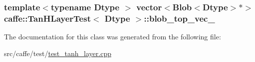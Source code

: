 \hypertarget{classcaffe_1_1_tan_h_layer_test_a44291748cc6643979a3dd592539f26d2}{
\subsubsection[{blob\+\_\+top\+\_\+vec\+\_\+}]{\setlength{\rightskip}{0pt plus 5cm}template$<$typename Dtype $>$ vector$<${\bf Blob}$<$Dtype$>$$\ast$$>$ {\bf caffe\+::\+Tan\+H\+Layer\+Test}$<$ Dtype $>$\+::blob\+\_\+top\+\_\+vec\+\_\+\hspace{0.3cm}{\ttfamily [protected]}}}\label{classcaffe_1_1_tan_h_layer_test_a44291748cc6643979a3dd592539f26d2}


The documentation for this class was generated from the following file\+:\begin{DoxyCompactItemize}
\item 
src/caffe/test/\hyperlink{test__tanh__layer_8cpp}{test\+\_\+tanh\+\_\+layer.\+cpp}\end{DoxyCompactItemize}
